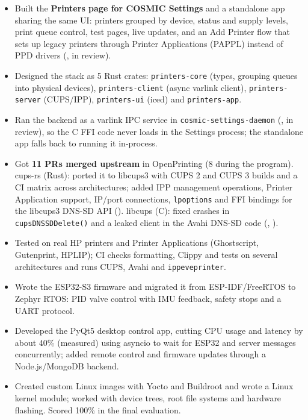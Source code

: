 \documentclass[10pt]{article}
\begin{document}
\begin{itemize}
  \item Built the \textbf{Printers page for COSMIC Settings} and a standalone app sharing the same UI: printers grouped by device, status and supply levels, print queue control, test pages, live updates, and an Add Printer flow that sets up legacy printers through Printer Applications (PAPPL) instead of PPD drivers (, in review).
  \item Designed the stack as 5 Rust crates: \texttt{printers-core} (types, grouping queues into physical devices), \texttt{printers-client} (async varlink client), \texttt{printers-server} (CUPS/IPP), \texttt{printers-ui} (iced) and \texttt{printers-app}.
  \item Ran the backend as a varlink IPC service in \texttt{cosmic-settings-daemon} (, in review), so the C FFI code never loads in the Settings process; the standalone app falls back to running it in-process.
  \item Got \textbf{11 PRs merged upstream} in OpenPrinting (8 during the program). cups-rs (Rust): ported it to libcups3 with CUPS 2 and CUPS 3 builds and a CI matrix across architectures; added IPP management operations, Printer Application support, IP/port connections, \texttt{lpoptions} and FFI bindings for the libcups3 DNS-SD API (). libcups (C): fixed crashes in \texttt{cupsDNSSDDelete()} and a leaked client in the Avahi DNS-SD code (, ).
  \item Tested on real HP printers and Printer Applications (Ghostscript, Gutenprint, HPLIP); CI checks formatting, Clippy and tests on several architectures and runs CUPS, Avahi and \texttt{ippeveprinter}.
\end{itemize}
\begin{itemize}
  \item Wrote the ESP32-S3 firmware and migrated it from ESP-IDF/FreeRTOS to Zephyr RTOS: PID valve control with IMU feedback, safety stops and a UART protocol.
  \item Developed the PyQt5 desktop control app, cutting CPU usage and latency by about 40\% (measured) using asyncio to wait for ESP32 and server messages concurrently; added remote control and firmware updates through a Node.js/MongoDB backend.
\end{itemize}
\begin{itemize}
  \item Created custom Linux images with Yocto and Buildroot and wrote a Linux kernel module; worked with device trees, root file systems and hardware flashing. Scored 100\% in the final evaluation.
\end{itemize}
\end{document}
